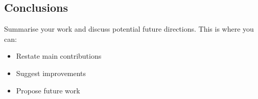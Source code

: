 \documentclass[11pt]{article}
\begin{document}
\begin{multicols}{2}
        \section{Conclusions}
        Summarise your work and discuss potential future directions. This is where you can:
        \begin{itemize}
            \item Restate main contributions
            \item Suggest improvements
            \item Propose future work
        \end{itemize}

        
        
    \end{multicols}
\end{document}
